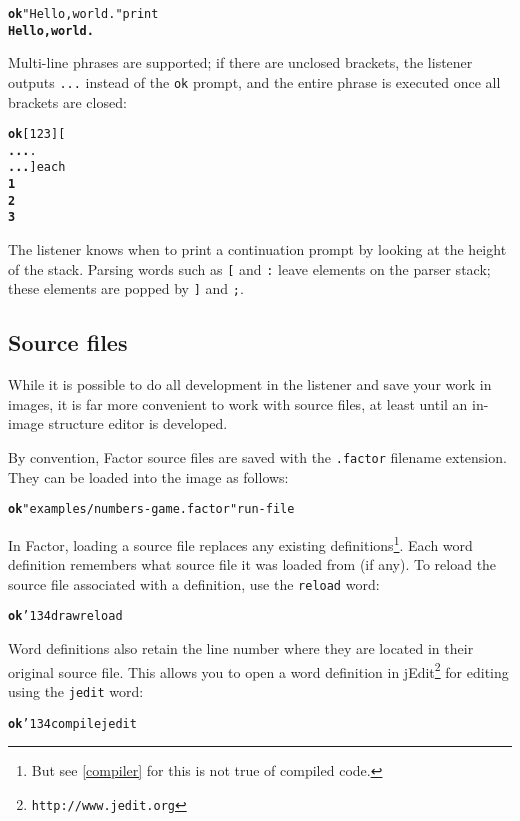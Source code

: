 \documentclass{article}
\newcommand{\ttbs}{\char'134}
\begin{document}
\begin{alltt}
\textbf{ok} "Hello, world." print
\textbf{Hello, world.}
\end{alltt}


Multi-line phrases are supported; if there are unclosed brackets, the listener outputs \texttt{...} instead of the \texttt{ok} prompt, and the entire phrase is executed once all brackets are closed:

\begin{alltt}
\textbf{ok} [ 1 2 3 ] [
\textbf{...} .
\textbf{...} ] each
\textbf{1
2
3}
\end{alltt}

The listener knows when to print a continuation prompt by looking at the height of the
stack. Parsing words such as \texttt{[} and \texttt{:} leave elements on the parser
stack; these elements are popped by \texttt{]} and \texttt{;}.

\subsection{Source files}

While it is possible to do all development in the listener and save your work in images, it is far more convenient to work with source files, at least until an in-image structure editor is developed.

By convention, Factor source files are saved with the \texttt{.factor} filename extension. They can be loaded into the image as follows:

\begin{alltt}
\textbf{ok} "examples/numbers-game.factor" run-file
\end{alltt}

In Factor, loading a source file replaces any existing definitions\footnote{But see \ref{compiler} for this is not true of compiled code.}. Each word definition remembers what source file it was loaded from (if any). To reload the source file associated with a definition, use the \texttt{reload} word:

\begin{alltt}
\textbf{ok} \ttbs draw reload
\end{alltt}

Word definitions also retain the line number where they are located in their original source file. This allows you to open a word definition in jEdit\footnote{\texttt{http://www.jedit.org}} for editing using the
\texttt{jedit} word:

\begin{alltt}
\textbf{ok} \ttbs compile jedit
\end{alltt}
\end{document}
